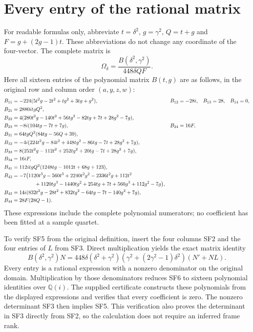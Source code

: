 \documentclass[11pt]{article}
\begin{document}
\section{Every entry of the rational matrix}
For readable formulas only, abbreviate
$t=\delta^2$, $g=\gamma^2$, $Q=t+g$ and $F=g+(2g-1)t$.
These abbreviations do not change any coordinate of the four-vector.
The complete matrix is
\begin{equation}
 \boxed{\quad\Omega_\delta=
             \frac{B(\delta^2,\gamma^2)}{448\delta QF}.\quad}
 \tag{SF5}
\end{equation}
Here all sixteen entries of the polynomial matrix $B(t,g)$ are
as follows, in the original row and column order $(a,y,z,w)$:
\begin{align*}
 B_{11}&=-224(5t^2g-2t^2+tg^2+3tg+g^2),&
 B_{12}&=-28i,&B_{13}&=28,&B_{14}&=0,\\
 B_{21}&=2880it gQ^2,&&&&\\
 B_{22}&=4(280t^2g-140t^2+56tg^2-82tg+7t+28g^2-7g),&&&&\\
 B_{23}&=-8i(104tg-7t+7g),& B_{24}&=16F,&&&\\
 B_{31}&=64t gQ^2(84tg-56Q+39),&&&&\\
 B_{32}&=-4i(224t^2g-84t^2+448tg^2-86tg-7t+28g^2+7g),&&&&\\
 B_{33}&=8(252t^2g-112t^2+252tg^2+20tg-7t+28g^2+7g),&&&&\\
 B_{34}&=16iF,&&&&\\
 B_{41}&=112it gQ^2(1248tg-1012t+68g+123),&&&&\\
 B_{42}&=-7\bigl(1120t^3g-560t^3+2240t^2g^2-2336t^2g+112t^2&&&&\\
 &\hspace{15mm}+1120tg^3-1440tg^2+254tg+7t+560g^3+112g^2-7g\bigr),&&&&\\
 B_{43}&=14i(832t^2g-28t^2+832tg^2-64tg-7t-140g^2+7g),&&&&\\
 B_{44}&=28F(28Q-1).&&&&
\end{align*}
These expressions include the complete polynomial numerators;
no coefficient has been fitted at a sample quartet.

To verify SF5 from the original definition, insert the four
columns SF2 and the four entries of $L$ from SF3. Direct
multiplication yields the exact matrix identity
\begin{equation}
 B(\delta^2,\gamma^2)N
 =448\delta(\delta^2+\gamma^2)
       (\gamma^2+(2\gamma^2-1)\delta^2)(N'+NL).\tag{SF6}
\end{equation}
Every entry is a rational expression with a nonzero denominator
on the original domain. Multiplication by those denominators
reduces SF6 to sixteen polynomial identities over $\mathbb Q(i)$.
The supplied certificate constructs these polynomials from the
displayed expressions and verifies that every coefficient is zero.
The nonzero determinant SF3 then implies SF5. This verification
also proves the determinant in SF3 directly from SF2, so the
calculation does not require an inferred frame rank.
\end{document}
